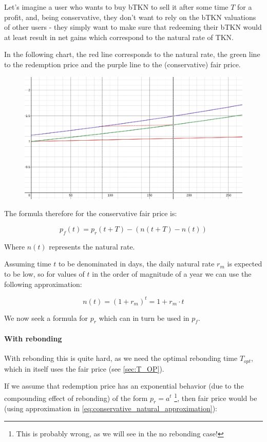 \documentclass{article}
\begin{document}
Let’s imagine a user who wants to buy bTKN to sell it after some time $T$ for a profit, and, being conservative, they don’t want to rely on the bTKN valuations of other users - they simply want to make sure that redeeming their bTKN would at least result in net gains which correspond to the natural rate of TKN.

In the following chart, the red line corresponds to the natural rate, the green line to the redemption price and the purple line to the (conservative) fair price.

\begin{figure}
    \centering
    \includegraphics[width=0.5\linewidth]{./ChickenBonds_Whitepaper_conservative_price.png}
\end{figure}

The formula therefore for the conservative fair price is:

\begin{equation}
  \label{eq:conservative-1}
p_f(t) = p_r(t + T) - (n(t+T) - n(t))
\end{equation}

Where $n(t)$ represents the natural rate.

Assuming time $t$ to be denominated in days, the daily natural rate $r_m$ is expected to be low, so for values of $t$ in the order of magnitude of a year we can use the following approximation:

\begin{equation}
  \label{eq:conservative_natural_approximation}
n(t) = (1 + r_m)^t = 1 + r_m \cdot t
\end{equation}

We now seek a formula for $p_r$ which can in turn be used in $p_f$. 

\paragraph{With rebonding}
With rebonding this is quite hard, as we need the optimal rebonding time $T_{opt}$, which in itself uses the fair price (see \ref{sec:T_OP}).

If we assume that redemption price has an exponential behavior (due to the compounding effect of rebonding) of the form $p_r = a^t$ \footnote{This is probably wrong, as we will see in the no rebonding case!}, then fair price would be (using approximation in \ref{eq:conservative_natural_approximation}):
\end{document}
